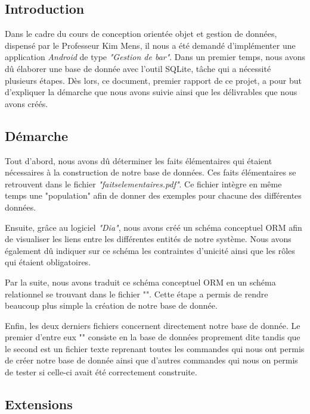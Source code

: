 \documentclass[11pt, a4, oneside, headings=normal]{scrreprt}
\begin{document}


\subsection*{Introduction}

Dans le cadre du cours de conception orientée objet et gestion de données, dispensé par le Professeur Kim Mens, il nous a été demandé d'implémenter une application \textit{Android} de type \textit{"Gestion de bar"}. Dans un premier temps, nous avons dû élaborer une base de donnée avec l'outil SQLite, tâche qui a nécessité plusieurs étapes. Dès lors, ce document, premier rapport de ce projet, a pour but d'expliquer la démarche que nous avons suivie ainsi que les délivrables que nous avons créés.

\subsection*{Démarche}

Tout d'abord, nous avons dû déterminer les faits élémentaires qui étaient nécessaires à la construction de notre base de données. Ces faits élémentaires se retrouvent dans le fichier \textit{"faitselementaires.pdf"}. Ce fichier intègre en même temps une "population" afin de donner des exemples pour chacune des différentes données.

Ensuite, grâce au logiciel \textit{"Dia"}, nous avons créé un schéma conceptuel ORM afin de visualiser les liens entre les différentes entités de notre système. Nous avons également dû indiquer sur ce schéma les contraintes d'unicité ainsi que les rôles qui étaient obligatoires.

Par la suite, nous avons traduit ce schéma conceptuel ORM en un schéma relationnel se trouvant dans le fichier "". Cette étape a permis de rendre beaucoup plus simple la création de notre base de donnée.

Enfin, les deux derniers fichiers concernent directement notre base de donnée. Le premier d'entre eux "" consiste en la base de données proprement dite tandis que le second est un fichier texte reprenant toutes les commandes qui nous ont permis de créer notre base de donnée ainsi que d'autres commandes qui nous on permis de tester si celle-ci avait été correctement construite.

\subsection*{Extensions}
\end{document}
